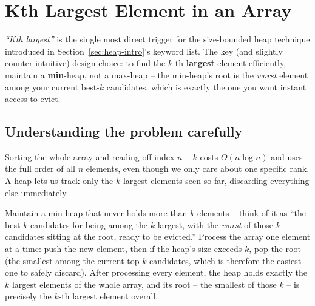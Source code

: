 \section{Kth Largest Element in an Array}
\label{sec:heap-kth-largest}


\begin{patternbox}
\emph{``Kth largest''} is the single most direct trigger for the
size-bounded heap technique introduced in
Section~\ref{sec:heap-intro}'s keyword list. The key (and slightly
counter-intuitive) design choice: to find the $k$-th \textbf{largest}
element efficiently, maintain a \textbf{min}-heap, not a max-heap -- the
min-heap's root is the \emph{worst} element among your current best-$k$
candidates, which is exactly the one you want instant access to evict.
\end{patternbox}

\subsection*{Understanding the problem carefully}

Sorting the whole array and reading off index $n-k$ costs
$O(n \log n)$ and uses the full order of all $n$ elements, even though we
only care about one specific rank. A heap lets us track only the $k$
largest elements seen so far, discarding everything else immediately.

\begin{ideabox}
Maintain a min-heap that never holds more than $k$ elements -- think of it
as ``the best $k$ candidates for being among the $k$ largest, with the
\emph{worst} of those $k$ candidates sitting at the root, ready to be
evicted.'' Process the array one element at a time: push the new element,
then if the heap's size exceeds $k$, pop the root (the smallest among the
current top-$k$ candidates, which is therefore the easiest one to safely
discard). After processing every element, the heap holds exactly the $k$
largest elements of the whole array, and its root -- the smallest of
those $k$ -- is precisely the $k$-th largest element overall.
\end{ideabox}

